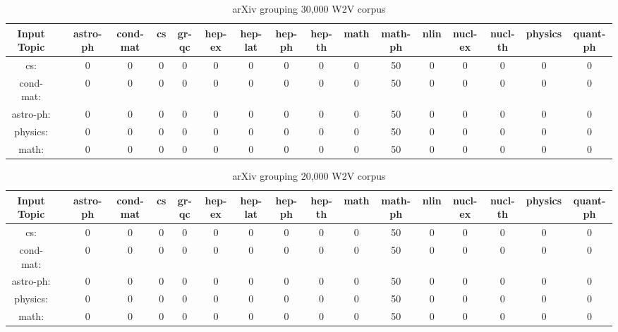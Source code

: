 \begin{sidewaystable}[h]
    \begin{tabular}{|c c c c c c c c c c c c c c c c c|}
         \hline
         Input Topic & & astro-ph & cond-mat & cs & gr-qc & hep-ex &hep-lat & hep-ph & hep-th & math & math-ph & nlin & nucl-ex & nucl-th & physics & quant-ph \\ [0.5ex]
         \hline\hline
         cs: & & 0 & 0 & 0 & 0 & 0 & 0 & 0 & 0 & 0 & 50 & 0 & 0 & 0 & 0 & 0 \\
         cond-mat: & & 0 & 0 & 0 & 0 & 0 & 0 & 0 & 0 & 0 & 50 & 0 & 0 & 0 & 0 & 0\\
         astro-ph: & & 0 & 0 & 0 & 0 & 0 & 0 & 0 & 0 & 0 & 50 & 0 & 0 & 0 & 0 & 0 \\
         physics: & & 0 & 0 & 0 & 0 & 0 & 0 & 0 & 0 & 0 & 50 & 0 & 0 & 0 & 0 & 0 \\
         math: & & 0 & 0 & 0 & 0 & 0 & 0 & 0 & 0 & 0 & 50 & 0 & 0 & 0 & 0 & 0 \\ [1ex]
         \hline
    \end{tabular}
    \caption{arXiv grouping 30,000 W2V corpus}
    \label{table:arxiv30000w2v}
\end{sidewaystable}

\begin{sidewaystable}[h]
    \begin{tabular}{|c c c c c c c c c c c c c c c c c|}
         \hline
         Input Topic & & astro-ph & cond-mat & cs & gr-qc & hep-ex &hep-lat & hep-ph & hep-th & math & math-ph & nlin & nucl-ex & nucl-th & physics & quant-ph \\ [0.5ex]
         \hline\hline
         cs: & & 0 & 0 & 0 & 0 & 0 & 0 & 0 & 0 & 0 & 50 & 0 & 0 & 0 & 0 & 0 \\
         cond-mat: & & 0 & 0 & 0 & 0 & 0 & 0 & 0 & 0 & 0 & 50 & 0 & 0 & 0 & 0 & 0\\
         astro-ph: & & 0 & 0 & 0 & 0 & 0 & 0 & 0 & 0 & 0 & 50 & 0 & 0 & 0 & 0 & 0 \\
         physics: & & 0 & 0 & 0 & 0 & 0 & 0 & 0 & 0 & 0 & 50 & 0 & 0 & 0 & 0 & 0 \\
         math: & & 0 & 0 & 0 & 0 & 0 & 0 & 0 & 0 & 0 & 50 & 0 & 0 & 0 & 0 & 0 \\ [1ex]
         \hline
    \end{tabular}
    \caption{arXiv grouping 20,000 W2V corpus}
    \label{table:arxiv20000w2v}
\end{sidewaystable}

